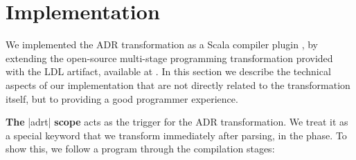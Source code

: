 \section{Implementation}
\label{sec:impl}


We implemented the ADR transformation as a Scala compiler plugin \cite{ildl-plugin}, by extending the open-source multi-stage programming transformation provided with the LDL \cite{ldl} artifact, available at \cite{ldl-staging-plugin}. In this section we describe the technical aspects of our implementation that are not directly related to the transformation itself, but to providing a good programmer experience.




\vspace{0.3em}
\noindent \textbf{The} |adrt| \textbf{scope} acts as the trigger for the ADR transformation.
%
We treat it as a special keyword that we transform immediately after parsing, in the \postparser{} phase.
To show this, we follow a program through the compilation stages:

